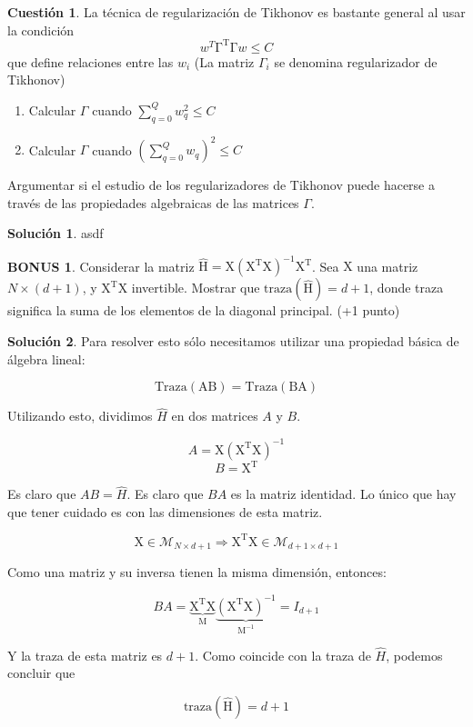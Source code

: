 \documentclass[a4paper, 11pt]{article}
\theoremstyle{definition}
\newtheorem{cuestion}{Cuestión}
\newtheorem*{solucion}{Solución}
\newtheorem*{bonus}{BONUS}
\begin{document}
  \begin{cuestion}
    La técnica de regularización de Tikhonov es bastante general al usar la condición
    \[
    w^T\mathrm{\Gamma^T\Gamma}w\leq C
    \]
    que define relaciones entre las $w_i$ (La matriz $\Gamma_i$ se denomina regularizador de Tikhonov)
    \begin{enumerate}
    \item Calcular $\Gamma$ cuando $\sum_{q=0}^Q w_q^2 \leq C$
    \item Calcular $\Gamma$ cuando $(\sum_{q=0}^Q w_q)^2 \leq C$
    \end{enumerate}
    Argumentar si el estudio de los regularizadores de Tikhonov puede hacerse a través de las propiedades algebraicas de las matrices $\Gamma$.
  \end{cuestion}

  \begin{solucion}
    asdf
  \end{solucion}

  \begin{bonus}
    Considerar la matriz $\hat{\mathrm{H}}=\mathrm{X(X^TX)^{-1}X^T}$. Sea $\mathrm{X}$ una matriz  $N\times (d+1)$, y $\mathrm{X^TX}$ invertible. Mostrar que $\mathrm{traza(\hat{H})}=d+1$, donde traza significa la suma de los elementos de la diagonal principal. (+1 punto)
  \end{bonus}

  \begin{solucion}
    Para resolver esto sólo necesitamos utilizar una propiedad básica de álgebra lineal:

    $$ \mathrm{Traza(AB)}=\mathrm{Traza(BA)}$$

    Utilizando esto, dividimos $\hat{H}$ en dos matrices $A$ y $B$.

    $$A = \mathrm{X(X^TX)^{-1}}$$
    $$B = \mathrm{X^T}$$

    Es claro que $AB=\hat{H}$. Es claro que $BA$ es la matriz identidad. Lo único que hay que tener cuidado es con las dimensiones de esta matriz.

    $$\mathrm{X} \in \mathcal{M}_{N \times d+1} \Rightarrow \mathrm{X^TX} \in \mathcal{M}_{d+1 \times d+1}$$

    Como una matriz y su inversa tienen la misma dimensión, entonces:

    $$BA=\mathrm{\underbrace{X^TX}_M\underbrace{(X^TX)^{-1}}_{M^{-1}}}=I_{d+1}$$

    Y la traza de esta matriz es $d+1$. Como coincide con la traza de $\hat{H}$, podemos concluir que

    $$\mathrm{traza(\hat{H})}=d+1$$
  \end{solucion}
\end{document}
